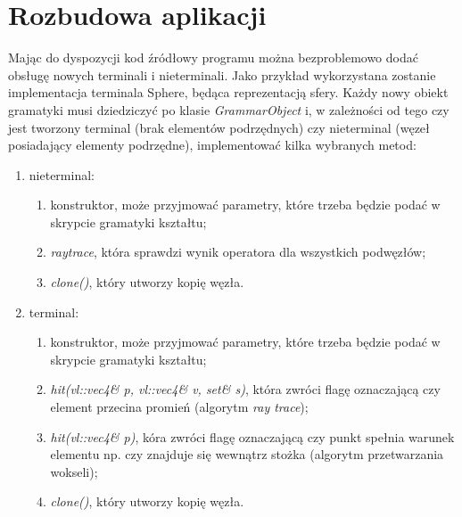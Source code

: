 \section{Rozbudowa aplikacji}
Mając do dyspozycji kod źródłowy programu można bezproblemowo dodać obsługę
nowych terminali i nieterminali. Jako przykład wykorzystana zostanie
implementacja terminala Sphere, będąca reprezentacją sfery.
Każdy nowy obiekt gramatyki musi dziedziczyć po klasie \emph{GrammarObject}
i, w zależności od tego czy jest tworzony terminal (brak elementów podrzędnych)
czy nieterminal (węzeł posiadający elementy podrzędne), implementować kilka
wybranych metod:
\begin{enumerate}
  \item nieterminal: 
  \begin{enumerate}
    \item konstruktor, może przyjmować parametry, które trzeba będzie podać w
    skrypcie gramatyki kształtu;
    \item \emph{raytrace}, która sprawdzi wynik operatora dla wszystkich
    podwęzłów;
    \item \emph{clone()}, który utworzy kopię węzła.
  \end{enumerate}
  \item terminal: 
  \begin{enumerate}
    \item konstruktor, może przyjmować parametry, które trzeba będzie podać w
    skrypcie gramatyki kształtu;
    \item \emph{hit(vl::vec4\& p, vl::vec4\& v, set\& s)}, która zwróci flagę
    oznaczającą czy element przecina promień (algorytm \emph{ray trace});
    \item \emph{hit(vl::vec4\& p)}, kóra zwróci flagę oznaczającą czy punkt
    spełnia warunek elementu np. czy znajduje się wewnątrz stożka (algorytm
    przetwarzania wokseli);
    \item \emph{clone()}, który utworzy kopię węzła.
  \end{enumerate}
\end{enumerate}


